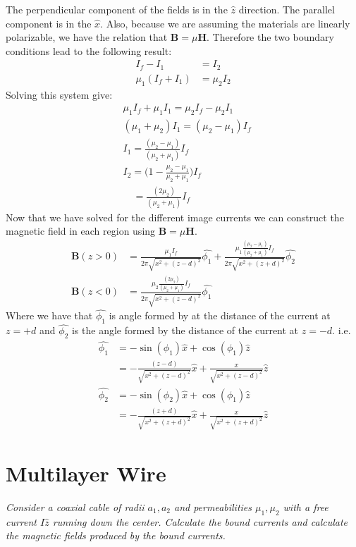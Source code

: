 \documentclass[a4paper, 11pt]{article}
\begin{document}
The perpendicular component of the fields is in the $\hat{z}$ direction. The parallel component is in the $\hat{x}$. Also, because we are assuming the materials are linearly polarizable, we have the relation that $\mathbf{B} = \mu \mathbf{H}$. Therefore the two boundary conditions lead to the following result: 
	\begin{align}
		I_f - I_1 &= I_2 \\ 
		\mu_1(I_f+I_1)&= \mu_2 I_2 
	\end{align}
Solving this system give: 
	\begin{align*}
		&\mu_1 I_f + \mu_1 I_1 = \mu_2 I_f - \mu_2 I_1 \\ 
		&(\mu_1 + \mu_2)I_1 = (\mu_2 -\mu_1)I_f \\ 
		&I_1 = \frac{(\mu_2 - \mu_1)}{(\mu_2 + \mu_1)}I_f \\ 
		&I_2 = \Big(1-\frac{\mu_2-\mu_1}{\mu_2+\mu_1}\Big)I_f \\ 
		&\quad = \frac{(2\mu_2)}{(\mu_2+\mu_1)}I_f 
	\end{align*}
Now that we have solved for the different image currents we can construct the magnetic field in each region using $\mathbf{B} = \mu\mathbf{H}$. 
	\begin{align}
		\mathbf{B}(z>0) &=\frac{\mu_1 I_f}{2\pi\sqrt{x^2+(z-d)^2}}\hat{\phi_1}+\frac{\mu_1\frac{(\mu_2 - \mu_1)}{(\mu_2 + \mu_1)}I_f }{2\pi\sqrt{x^2+(z+d)^2}}\hat{\phi_2}\\ 
		\mathbf{B}(z<0) &= \frac{\mu_2\frac{(2\mu_2)}{(\mu_2+\mu_1)}I_f}{2\pi\sqrt{x^2+(z-d)^2}}\hat{\phi_1} 
	\end{align}
Where we have that $\hat{\phi_1}$ is angle formed by at the distance of the current at $z=+d$ and $\hat{\phi_2}$ is the angle formed by the distance of the current at $z=-d$. i.e. 
	\begin{align*}
		\hat{\phi_1}	&= -\sin(\phi_1)\hat{x} + \cos(\phi_1)\hat{z} \\ 
						&= -\frac{(z-d)}{\sqrt{x^2+(z-d)^2}}\hat{x} + \frac{x}{\sqrt{x^2+(z-d)^2}}\hat{z} \\ 
		\hat{\phi_2}	&= -\sin(\phi_2)\hat{x} + \cos(\phi_1)\hat{z} \\ 
						&= -\frac{(z+d)}{\sqrt{x^2+(z+d)^2}}\hat{x} +  \frac{x}{\sqrt{x^2+(z+d)^2}}\hat{z}
	\end{align*}
	
	
\section*{Multilayer Wire}
\textit{Consider a coaxial cable of radii $a_1, a_2$ and permeabilities $\mu_1, \mu_2$ with a free current $I\hat{z}$ running down the center. Calculate the bound currents and calculate the magnetic fields produced by the bound currents.} \\ 
\end{document}
